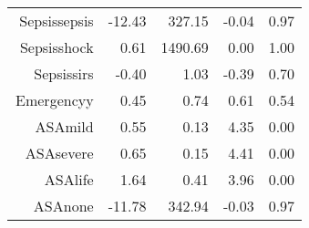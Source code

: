 \begin{tabular}{rrrrr}
$$  Sepsis\-sepsis & -12.43 & 327.15 & -0.04 & 0.97 \\ 
  Sepsis\-shock & 0.61 & 1490.69 & 0.00 & 1.00 \\ 
  Sepsis\-sirs & -0.40 & 1.03 & -0.39 & 0.70 \\ 
  Emergency\-y & 0.45 & 0.74 & 0.61 & 0.54 \\ 
  ASA\-mild & 0.55 & 0.13 & 4.35 & 0.00 \\ 
  ASA\-severe & 0.65 & 0.15 & 4.41 & 0.00 \\ 
  ASA\-life & 1.64 & 0.41 & 3.96 & 0.00 \\ 
  ASA\-none & -11.78 & 342.94 & -0.03 & 0.97 \\ 
   \hline
\end{tabular}

\bigskip\bigskip
\centering

